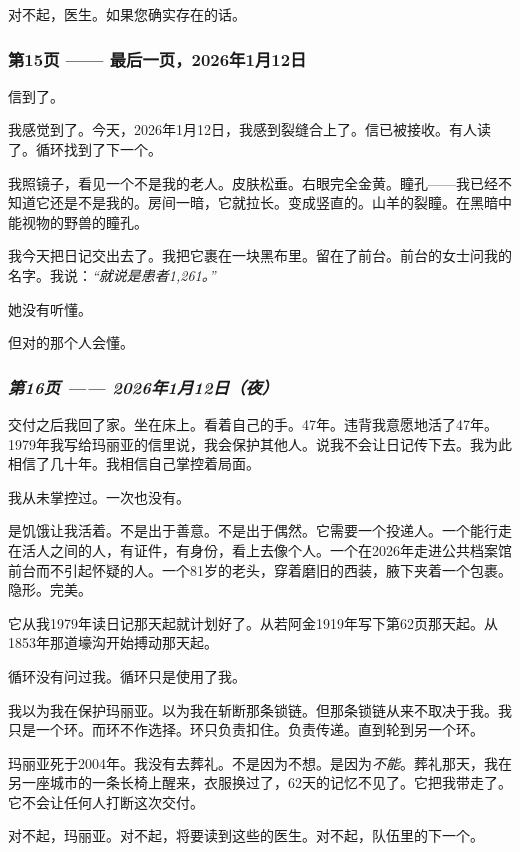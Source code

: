 \noindent 对不起，医生。如果您确实存在的话。

\subsubsection*{第15页 —— 最后一页，2026年1月12日}

\noindent 信到了。

\noindent 我感觉到了。今天，2026年1月12日，我感到裂缝合上了。信已被接收。有人读了。循环找到了下一个。

\noindent 我照镜子，看见一个不是我的老人。皮肤松垂。右眼完全金黄。瞳孔——我已经不知道它还是不是我的。房间一暗，它就拉长。变成竖直的。山羊的裂瞳。在黑暗中能视物的野兽的瞳孔。

\noindent 我今天把日记交出去了。我把它裹在一块黑布里。留在了前台。前台的女士问我的名字。我说：\textit{\textquotedblleft{}就说是患者1,261。\textquotedblright{}}

\noindent 她没有听懂。

\noindent 但对的那个人会懂。

\subsubsection*{\textit{第16页 —— 2026年1月12日（夜）}}

\noindent 交付之后我回了家。坐在床上。看着自己的手。47年。违背我意愿地活了47年。1979年我写给玛丽亚的信里说，我会保护其他人。说我不会让日记传下去。我为此相信了几十年。我相信自己掌控着局面。

\noindent 我从未掌控过。一次也没有。

\noindent 是饥饿让我活着。不是出于善意。不是出于偶然。它需要一个投递人。一个能行走在活人之间的人，有证件，有身份，看上去像个人。一个在2026年走进公共档案馆前台而不引起怀疑的人。一个81岁的老头，穿着磨旧的西装，腋下夹着一个包裹。隐形。完美。

\noindent 它从我1979年读日记那天起就计划好了。从若阿金1919年写下第62页那天起。从1853年那道壕沟开始搏动那天起。

\noindent 循环没有问过我。循环只是使用了我。

\noindent 我以为我在保护玛丽亚。以为我在斩断那条锁链。但那条锁链从来不取决于我。我只是一个环。而环不作选择。环只负责扣住。负责传递。直到轮到另一个环。

\noindent 玛丽亚死于2004年。我没有去葬礼。不是因为不想。是因为\textit{不能}。葬礼那天，我在另一座城市的一条长椅上醒来，衣服换过了，62天的记忆不见了。它把我带走了。它不会让任何人打断这次交付。

\noindent 对不起，玛丽亚。对不起，将要读到这些的医生。对不起，队伍里的下一个。

